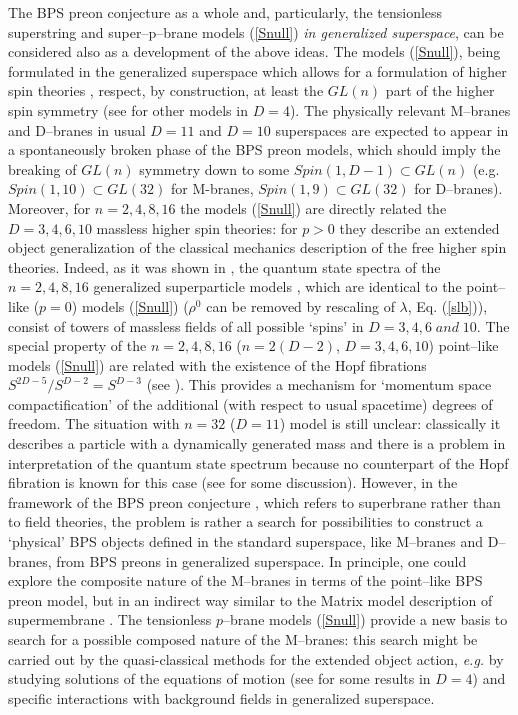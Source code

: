 \documentclass[a4paper,11pt]{article}
\begin{document}
The BPS preon conjecture \cite{BPS01} as a whole and, particularly,  
the tensionless superstring and 
super--p--brane models (\ref{Snull}) {\sl in generalized 
superspace}, can be considered also as a development of the above ideas. 
The models (\ref{Snull}), being formulated in the generalized superspace 
which allows for a formulation of higher spin theories \cite{Fr86,V01s,V01c},  
respect, by construction, at least the $GL(n)$ part of 
the higher spin symmetry 
(see \cite{ZL,ZU} for other models in $D=4$). 
The physically relevant M--branes and D--branes 
in usual $D=11$ and $D=10$ superspaces are expected to 
appear in a spontaneously broken phase
of the BPS preon models, which should imply the breaking 
of $GL(n)$ symmetry down to some $Spin(1,D-1) \subset GL(n)$
(e.g. $Spin(1,10) \subset GL(32)$ for M-branes, 
$Spin(1,9) \subset GL(32)$ for D--branes). 
Moreover, for $n=2,4,8,16$ the models (\ref{Snull}) are directly related 
the $D=3,4,6, 10$ massless  higher spin theories: for $p>0$  they 
describe an extended object generalization of the 
classical mechanics description of 
the free higher spin theories. 
Indeed, as it was shown in 
\cite{BLS99}, 
 the quantum state spectra  of the $n=2,4,8,16$ 
generalized superparticle models \cite{BL98}, which 
are identical to the 
point--like ($p=0$)  
models (\ref{Snull}) 
($\rho^0$ can be removed by rescaling of  $\lambda$, Eq. (\ref{slb})), 
consist of 
towers of massless fields of all possible `spins' in 
$D=3,4,6\; and \; 10$. 
The special property of the  
$n=2,4,8,16$ ($n=2(D-2)$, $D=3,4,6, 10$) point--like 
models (\ref{Snull}) are related with the existence of the Hopf fibrations 
$S^{2D-5}/S^{D-2}= S^{D-3}$ (see \cite{BLS99}). 
This provides a mechanism for `momentum space compactification' of 
the additional (with respect to usual spacetime) degrees of freedom. 
The situation with 
$n=32$ ($D=11$) model is still unclear: 
classically it describes a particle with a dynamically generated mass 
\cite{BL98,BL98'} and there is a problem in interpretation of the 
quantum state spectrum because no counterpart of the Hopf fibration 
is known for this case (see \cite{BL98'} for some discussion). 
However, in the framework of the BPS preon conjecture \cite{BPS01}, 
which refers to superbrane rather than to field theories, 
the problem is rather a search for possibilities  to construct a  
`physical' BPS objects defined in the standard superspace, 
like M--branes and D--branes, from  BPS preons in generalized superspace. 
In principle, one could explore the composite nature of the M--branes in terms
of the    point--like BPS preon model,  but in an indirect way 
similar to the Matrix model description of supermembrane  \cite{MT}. 
The tensionless $p$--brane models (\ref{Snull}) provide a new basis to 
search for a possible composed nature of the M--branes: 
this search might be carried out by the quasi-classical methods 
for the extended object action, {\it e.g.} by studying solutions of 
the  equations of motion (see \cite{ZL} for some results in $D=4$) 
and specific interactions with background fields in generalized superspace.
\end{document}
